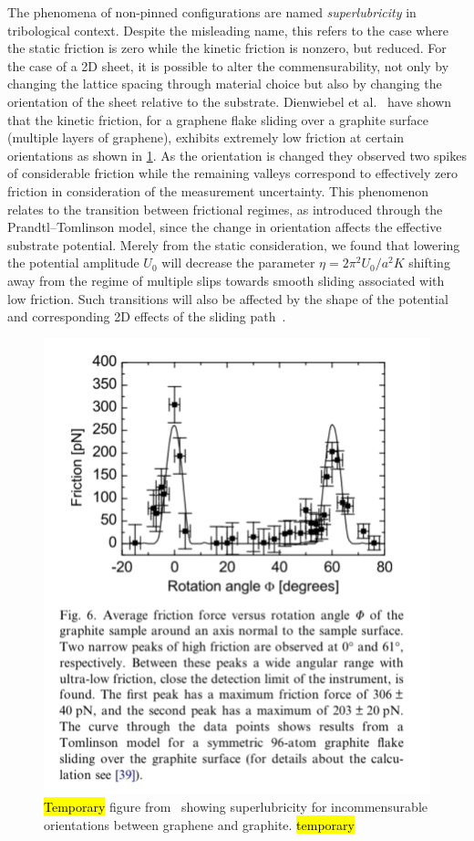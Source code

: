 The phenomena of non-pinned configurations are named \textit{superlubricity} in
tribological context. Despite the misleading name, this refers to the case
where the static friction is zero while the kinetic friction is nonzero, but
reduced. For the case of a 2D sheet, it is possible to alter the
commensurability, not only by changing the lattice spacing through material
choice but also by changing the orientation of the sheet relative to the
substrate. Dienwiebel et al.~\cite{DIENWIEBEL2005197} have shown that the
kinetic friction, for a graphene flake sliding over a graphite surface (multiple
layers of graphene), exhibits extremely low friction at certain orientations as
shown in \cref{fig:graphene_rot}. As the orientation is changed they observed two spikes of considerable friction while the remaining valleys correspond to effectively zero friction in consideration of the measurement uncertainty. This phenomenon relates to the transition between frictional regimes, as introduced through the Prandtl–Tomlinson model, since the change in orientation affects the
effective substrate potential. Merely from the static consideration, we found that
lowering the potential amplitude $U_0$ will decrease the parameter $\eta =
2\pi^2U_0/a^2K$ shifting away from the regime of multiple slips towards smooth
sliding associated with low friction. Such transitions will also be affected by the shape of the potential and corresponding 2D effects of the sliding path~\cite{Yalin_2011}.

\begin{figure}[H]
  \centering
  \includegraphics[width=0.5\linewidth]{figures/theory/graphene_rot.png}
  \caption{\hl{Temporary} figure from~\cite{DIENWIEBEL2005197} showing superlubricity for incommensurable orientations between graphene and graphite. \hl{temporary}}
  \label{fig:graphene_rot}
\end{figure}





